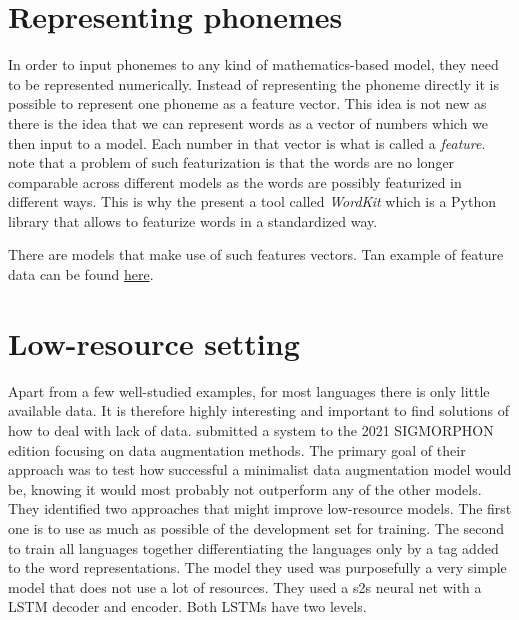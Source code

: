 \section{Representing phonemes}
\label{phon-features}
In order to input phonemes to any kind of mathematics-based model, they need to be represented numerically. Instead of representing the phoneme directly it is possible to represent one phoneme as a feature vector. This idea is not new as there is the idea that we can represent words as a vector of numbers which we then input to a model. Each number in that vector is what is called a \textit{feature}. \citet{tulkens-etal-2018-wordkit} note that a problem of such featurization is that the words are no longer comparable across different models as the words are possibly featurized in different ways. This is why the present a tool called \textit{WordKit} which is a Python library that allows to featurize words in a standardized way.


There are models that make use of such features vectors. Tan example of feature data can be found \href{https://github.com/uiuc-sst/g2ps}{here}.

\section{Low-resource setting}
Apart from a few well-studied examples, for most languages there is only little available data. It is therefore highly interesting and important to find solutions of how to deal with lack of data. \cite{hammond-2021-data} submitted a system to the 2021 SIGMORPHON edition focusing on data augmentation methods. The primary goal of their approach was to test how successful a minimalist data augmentation model would be, knowing it would most probably not outperform any of the other models. They identified two approaches that might improve low-resource models. The first one is to use as much as possible of the development set for training. The second to train all languages together differentiating the languages only by a tag added to the word representations. The model they used was purposefully a very simple model that does not use a lot of resources. They used a \ac{s2s} neural net with a LSTM decoder and encoder. Both LSTMs have two levels. 


